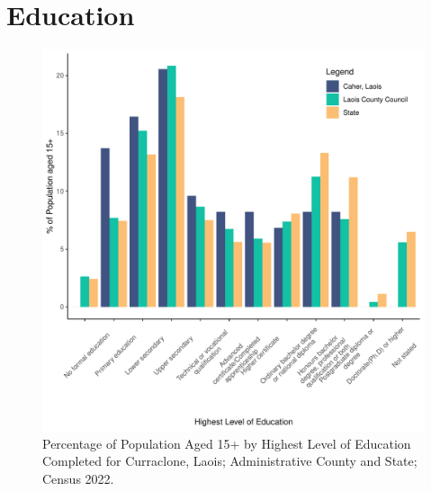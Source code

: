 \documentclass{article}
\begin{document}
\section{Education}\label{sect:Edu}
\begin{figure}[H]
	\centering
	\includegraphics[width = 120mm]{../figures/EduED.pdf}
	\caption{Percentage of Population Aged 15+ by Highest Level of Education Completed for Curraclone, Laois; Administrative County and State; Census 2022.}
	\label{fig:vbnv}
	\end{figure}
\end{document}
